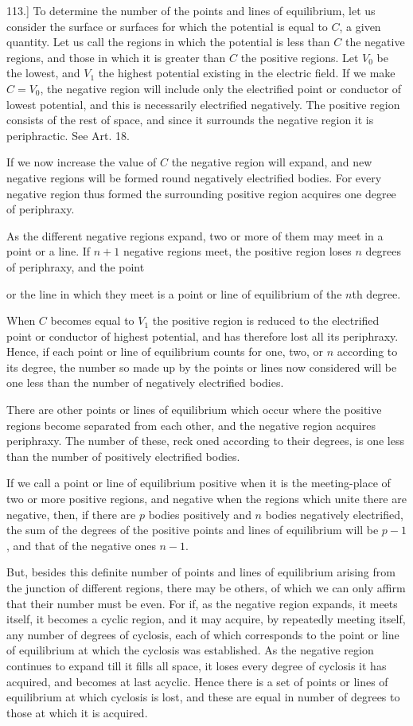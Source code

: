 \documentclass[11pt,a4paper]{article}
\begin{document}
113.] To determine the number of the points and lines of equilibrium, let us consider the surface or surfaces for which the potential is equal to $C$, a given quantity. Let us call the regions in which the potential is less than $C$ the negative regions, and those in which it is greater than $C$ the positive regions. Let $V_0$ be the lowest, and $V_1$ the highest potential existing in the electric field. If we make $C=V_0$, the negative region will include only the electrified point or conductor of lowest potential, and this is necessarily electrified negatively. The positive region consists of the rest of space, and since it surrounds the negative region it is periphractic. See Art. 18.

If we now increase the value of $C$ the negative region will expand, and new negative regions will be formed round negatively electrified bodies. For every negative region thus formed the surrounding positive region acquires one degree of periphraxy.

As the different negative regions expand, two or more of them may meet in a point or a line. If $n+1$ negative regions meet, the positive region loses $n$ degrees of periphraxy, and the point

or the line in which they meet is a point or line of equilibrium of the $n$th degree.

When $C$ becomes equal to $V_1$ the positive region is reduced to the electrified point or conductor of highest potential, and has therefore lost all its periphraxy. Hence, if each point or line of equilibrium counts for one, two, or $n$ according to its degree, the number so made up by the points or lines now considered will be one less than the number of negatively electrified bodies.

There are other points or lines of equilibrium which occur where the positive regions become separated from each other, and the negative region acquires periphraxy. The number of these, reck oned according to their degrees, is one less than the number of positively electrified bodies.

If we call a point or line of equilibrium positive when it is the meeting-place of two or more positive regions, and negative when the regions which unite there are negative, then, if there are $p$ bodies positively and $n$ bodies negatively electrified, the sum of the degrees of the positive points and lines of equilibrium will be $p-1$, and that of the negative ones $n-1$.

But, besides this definite number of points and lines of equilibrium arising from the junction of different regions, there may be others, of which we can only affirm that their number must be even. For if, as the negative region expands, it meets itself, it becomes a cyclic region, and it may acquire, by repeatedly meeting itself, any number of degrees of cyclosis, each of which corresponds to the point or line of equilibrium at which the cyclosis was established. As the negative region continues to expand till it fills all space, it loses every degree of cyclosis it has acquired, and becomes at last acyclic. Hence there is a set of points or lines of equilibrium at which cyclosis is lost, and these are equal in number of degrees to those at which it is acquired.
\end{document}
